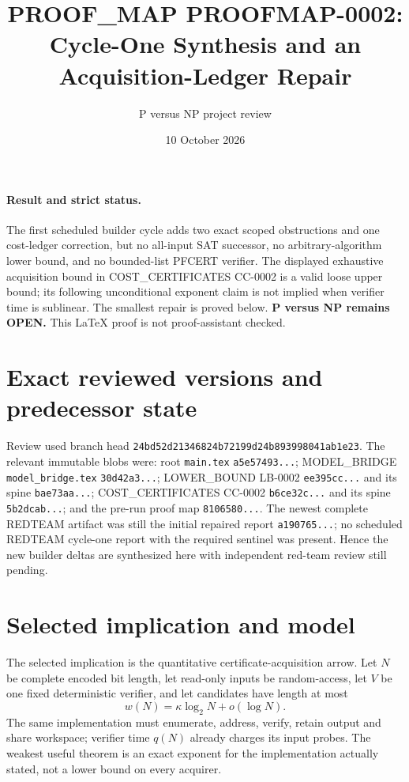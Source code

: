 \documentclass[11pt]{article}
\title{PROOF\_MAP PROOFMAP-0002: Cycle-One Synthesis and an Acquisition-Ledger Repair}
\author{P versus NP project review}
\date{10 October 2026}
\begin{document}
\maketitle

\paragraph{Result and strict status.}
The first scheduled builder cycle adds two exact scoped obstructions and one
cost-ledger correction, but no all-input SAT successor, no arbitrary-algorithm
lower bound, and no bounded-list PFCERT verifier.  The displayed exhaustive
acquisition bound in COST\_CERTIFICATES CC-0002 is a valid loose upper bound;
its following unconditional exponent claim is not implied when verifier time
is sublinear.  The smallest repair is proved below.  \textbf{P versus NP
remains OPEN.}  This LaTeX proof is not proof-assistant checked.

\section{Exact reviewed versions and predecessor state}
Review used branch head
\texttt{24bd52d21346824b72199d24b893998041ab1e23}.  The relevant immutable
blobs were: root \texttt{main.tex} \texttt{a5e57493...}; MODEL\_BRIDGE
\texttt{model\_bridge.tex} \texttt{30d42a3...}; LOWER\_BOUND LB-0002
\texttt{ee395cc...} and its spine \texttt{bae73aa...}; COST\_CERTIFICATES
CC-0002 \texttt{b6ce32c...} and its spine \texttt{5b2dcab...}; and the
pre-run proof map \texttt{8106580...}.  The newest complete REDTEAM artifact
was still the initial repaired report \texttt{a190765...}; no scheduled
REDTEAM cycle-one report with the required sentinel was present.  Hence the
new builder deltas are synthesized here with independent red-team review
still pending.

\section{Selected implication and model}
The selected implication is the quantitative certificate-acquisition arrow.
Let $N$ be complete encoded bit length, let read-only inputs be random-access,
let $V$ be one fixed deterministic verifier, and let candidates have length
at most
\[
 w(N)=\kappa\log_2N+o(\log N).
\]
The same implementation must enumerate, address, verify, retain output and
share workspace; verifier time $q(N)$ already charges its input probes.
The weakest useful theorem is an exact exponent for the implementation
actually stated, not a lower bound on every acquirer.
\end{document}
